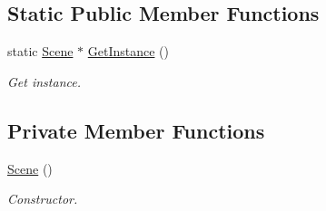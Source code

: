 \subsection*{Static Public Member Functions}
\begin{DoxyCompactItemize}
\item 
\mbox{\label{class_scene_aa0000b4d56229722e7aa8c151ad02a4f}} 
static \hyperlink{class_scene}{Scene} $\ast$ \hyperlink{class_scene_aa0000b4d56229722e7aa8c151ad02a4f}{Get\+Instance} ()
\begin{DoxyCompactList}\small\item\em Get instance. \end{DoxyCompactList}\end{DoxyCompactItemize}
\subsection*{Private Member Functions}
\begin{DoxyCompactItemize}
\item 
\mbox{\label{class_scene_ad10176d75a9cc0da56626f682d083507}} 
\hyperlink{class_scene_ad10176d75a9cc0da56626f682d083507}{Scene} ()
\begin{DoxyCompactList}\small\item\em Constructor. \end{DoxyCompactList}\end{DoxyCompactItemize}
